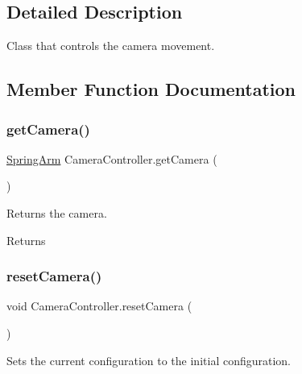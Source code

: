 \subsection{Detailed Description}
Class that controls the camera movement. 



\subsection{Member Function Documentation}
\mbox{\label{class_camera_controller_a6be56fdf0a1bea6589acaa9a7d6982b9}} 
\subsubsection{\texorpdfstring{get\+Camera()}{getCamera()}}
{\footnotesize\ttfamily \mbox{\hyperlink{class_spring_arm}{Spring\+Arm}} Camera\+Controller.\+get\+Camera (\begin{DoxyParamCaption}{ }\end{DoxyParamCaption})}



Returns the camera. 

\begin{DoxyReturn}{Returns}

\end{DoxyReturn}
\mbox{\label{class_camera_controller_abb8319c370c8608d49054dbf21ad1630}} 
\subsubsection{\texorpdfstring{reset\+Camera()}{resetCamera()}}
{\footnotesize\ttfamily void Camera\+Controller.\+reset\+Camera (\begin{DoxyParamCaption}{ }\end{DoxyParamCaption})}



Sets the current configuration to the initial configuration. 

\mbox{\label{class_camera_controller_afc12a02f3edac81d6ea356ed6b1084ca}} 
